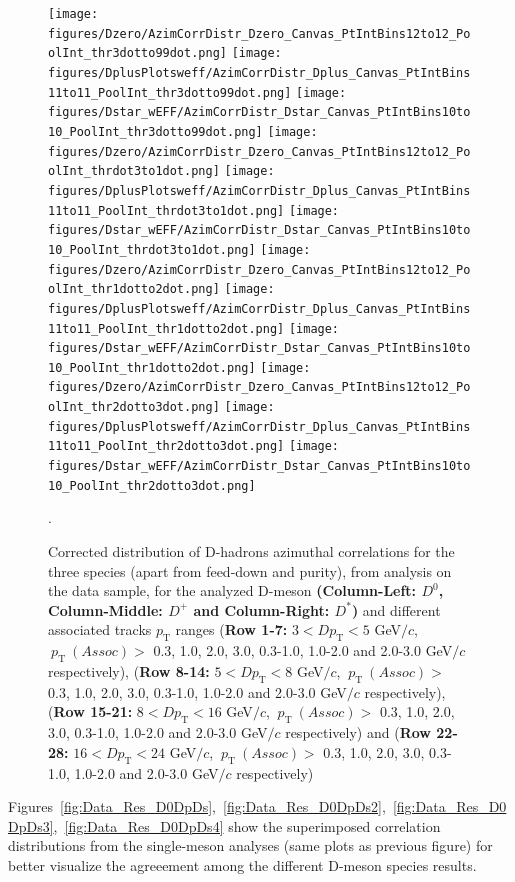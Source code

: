 \begin{figure}[!htbp]
\centering
{\texttt{[image: figures/Dzero/AzimCorrDistr\_Dzero\_Canvas\_PtIntBins12to12\_PoolInt\_thr3dotto99dot.png]}}
{\texttt{[image: figures/DplusPlotsweff/AzimCorrDistr\_Dplus\_Canvas\_PtIntBins11to11\_PoolInt\_thr3dotto99dot.png]}}
{\texttt{[image: figures/Dstar\_wEFF/AzimCorrDistr\_Dstar\_Canvas\_PtIntBins10to10\_PoolInt\_thr3dotto99dot.png]}}
{\texttt{[image: figures/Dzero/AzimCorrDistr\_Dzero\_Canvas\_PtIntBins12to12\_PoolInt\_thrdot3to1dot.png]}}
{\texttt{[image: figures/DplusPlotsweff/AzimCorrDistr\_Dplus\_Canvas\_PtIntBins11to11\_PoolInt\_thrdot3to1dot.png]}}
{\texttt{[image: figures/Dstar\_wEFF/AzimCorrDistr\_Dstar\_Canvas\_PtIntBins10to10\_PoolInt\_thrdot3to1dot.png]}}
{\texttt{[image: figures/Dzero/AzimCorrDistr\_Dzero\_Canvas\_PtIntBins12to12\_PoolInt\_thr1dotto2dot.png]}}
{\texttt{[image: figures/DplusPlotsweff/AzimCorrDistr\_Dplus\_Canvas\_PtIntBins11to11\_PoolInt\_thr1dotto2dot.png]}}
{\texttt{[image: figures/Dstar\_wEFF/AzimCorrDistr\_Dstar\_Canvas\_PtIntBins10to10\_PoolInt\_thr1dotto2dot.png]}}
{\texttt{[image: figures/Dzero/AzimCorrDistr\_Dzero\_Canvas\_PtIntBins12to12\_PoolInt\_thr2dotto3dot.png]}}
{\texttt{[image: figures/DplusPlotsweff/AzimCorrDistr\_Dplus\_Canvas\_PtIntBins11to11\_PoolInt\_thr2dotto3dot.png]}}
{\texttt{[image: figures/Dstar\_wEFF/AzimCorrDistr\_Dstar\_Canvas\_PtIntBins10to10\_PoolInt\_thr2dotto3dot.png]}}
\caption{Corrected distribution of D-hadrons azimuthal correlations for the three species (apart from feed-down and purity), from analysis on the data sample, for the analyzed D-meson \textbf{(Column-Left: $D^0$, Column-Middle: $D^+$ and Column-Right: $D^*$)} and different associated tracks $p_\text{T}$ ranges (\textbf{Row 1-7:} $3 < D p_\text{T} < 5$ GeV$/c$, $ \ p_\text{T}~(Assoc)>$ 0.3, 1.0, 2.0, 3.0, 0.3-1.0, 1.0-2.0 and 2.0-3.0 GeV$/c$ respectively), (\textbf{Row 8-14:} $5 < D p_\text{T} < 8$ GeV$/c$, $ \ p_\text{T}~(Assoc)>$ 0.3, 1.0, 2.0, 3.0, 0.3-1.0, 1.0-2.0 and 2.0-3.0 GeV$/c$ respectively),(\textbf{Row 15-21:} $8 < D p_\text{T} < 16$ GeV$/c$, $ \ p_\text{T}~(Assoc)>$ 0.3, 1.0, 2.0, 3.0, 0.3-1.0, 1.0-2.0 and 2.0-3.0 GeV$/c$ respectively) and (\textbf{Row 22-28:} $16 < D p_\text{T} < 24$ GeV$/c$, $ \ p_\text{T}~(Assoc)>$ 0.3, 1.0, 2.0, 3.0, 0.3-1.0, 1.0-2.0 and 2.0-3.0 GeV$/c$ respectively) }.
\label{fig:DataD0DpDs}
\end{figure}

Figures~\ref{fig:Data_Res_D0DpDs},~\ref{fig:Data_Res_D0DpDs2},~\ref{fig:Data_Res_D0DpDs3},~\ref{fig:Data_Res_D0DpDs4} show the superimposed correlation distributions from the single-meson analyses (same plots as previous figure) for better visualize the agreeement among the different D-meson species results.

